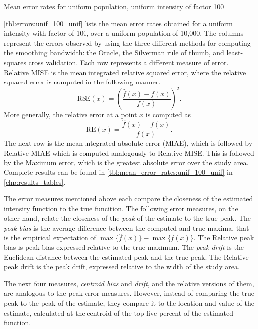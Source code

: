 \begin{table}[htbp]
\centering

\caption{Mean error rates for uniform population, uniform intensity of factor 100}
\label{tbl:errors:unif_100_unif}
\end{table}

\autoref{tbl:errors:unif_100_unif} lists the mean error rates obtained for a uniform intensity with factor of 100,
over a uniform population of 10,000.
The columns represent the errors observed by using the three different methods for computing the smoothing bandwidth:
the Oracle, the Silverman rule of thumb, and least-squares cross validation.
Each row represents a different measure of error.
Relative MISE is the mean integrated relative squared error,
where the relative squared error is computed in the following manner:
\[ \mbox{RSE}(x) = \left(\frac{\hat{f}(x)-f(x)}{f(x)}\right)^2 .\]
More generally, the relative error at a point \(x\) is computed as
\[ \mbox{RE}(x) =  \frac{\hat{f}(x)-f(x)}{f(x)} .\]
The next row is the mean integrated absolute error (MIAE),
which is followed by Relative MIAE which is computed analogously to Relative MISE.
This is followed by the Maximum error, which is the greatest absolute error over the study area.
Complete results can be found in \autoref{tbl:mean_error_rates:unif_100_unif} in \autoref{chp:results_tables}.

The error measures mentioned above each compare the closeness of the estimated intensity function to the true funcition.
The following error measures, on the other hand, relate the closeness of the \textit{peak} of the estimate to the true peak.
The \textit{peak bias} is the average difference between the computed and true maxima,
that is the empirical expectation of \(\max{\{\hat{f}(x)\}} - \max{\{f(x)\}}\).
The Relative peak bias is peak bias expressed relative to the true maximum.
The \textit{peak drift} is the Euclidean distance between the estimated peak and the true peak.
The Relative peak drift is the peak drift, expressed relative to the width of the study area.

The next four measures, \textit{centroid bias} and \textit{drift}, and the relative versions of them, are analogous to the peak error measures.
However, instead of comparing the true peak to the peak of the estimate, they compare it to the location and value of the estimate, calculated at the centroid of the top five percent of the estimated function.

